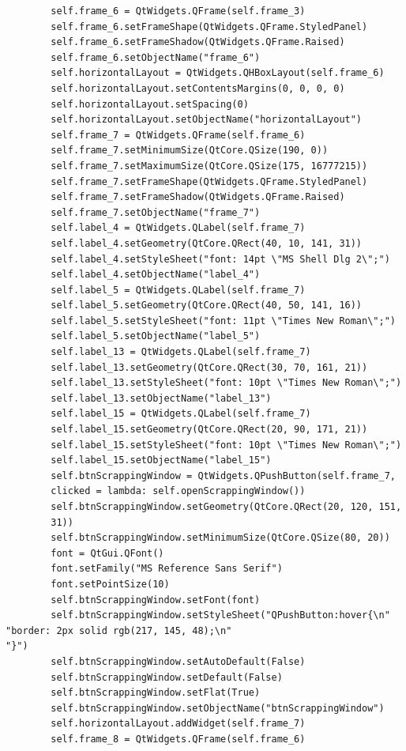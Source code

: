 \documentclass[12pt]{article}
\begin{document}
\begin{verbatim}
        self.frame_6 = QtWidgets.QFrame(self.frame_3)
        self.frame_6.setFrameShape(QtWidgets.QFrame.StyledPanel)
        self.frame_6.setFrameShadow(QtWidgets.QFrame.Raised)
        self.frame_6.setObjectName("frame_6")
        self.horizontalLayout = QtWidgets.QHBoxLayout(self.frame_6)
        self.horizontalLayout.setContentsMargins(0, 0, 0, 0)
        self.horizontalLayout.setSpacing(0)
        self.horizontalLayout.setObjectName("horizontalLayout")
        self.frame_7 = QtWidgets.QFrame(self.frame_6)
        self.frame_7.setMinimumSize(QtCore.QSize(190, 0))
        self.frame_7.setMaximumSize(QtCore.QSize(175, 16777215))
        self.frame_7.setFrameShape(QtWidgets.QFrame.StyledPanel)
        self.frame_7.setFrameShadow(QtWidgets.QFrame.Raised)
        self.frame_7.setObjectName("frame_7")
        self.label_4 = QtWidgets.QLabel(self.frame_7)
        self.label_4.setGeometry(QtCore.QRect(40, 10, 141, 31))
        self.label_4.setStyleSheet("font: 14pt \"MS Shell Dlg 2\";")
        self.label_4.setObjectName("label_4")
        self.label_5 = QtWidgets.QLabel(self.frame_7)
        self.label_5.setGeometry(QtCore.QRect(40, 50, 141, 16))
        self.label_5.setStyleSheet("font: 11pt \"Times New Roman\";")
        self.label_5.setObjectName("label_5")
        self.label_13 = QtWidgets.QLabel(self.frame_7)
        self.label_13.setGeometry(QtCore.QRect(30, 70, 161, 21))
        self.label_13.setStyleSheet("font: 10pt \"Times New Roman\";")
        self.label_13.setObjectName("label_13")
        self.label_15 = QtWidgets.QLabel(self.frame_7)
        self.label_15.setGeometry(QtCore.QRect(20, 90, 171, 21))
        self.label_15.setStyleSheet("font: 10pt \"Times New Roman\";")
        self.label_15.setObjectName("label_15")
        self.btnScrappingWindow = QtWidgets.QPushButton(self.frame_7,
        clicked = lambda: self.openScrappingWindow())
        self.btnScrappingWindow.setGeometry(QtCore.QRect(20, 120, 151,
        31))
        self.btnScrappingWindow.setMinimumSize(QtCore.QSize(80, 20))
        font = QtGui.QFont()
        font.setFamily("MS Reference Sans Serif")
        font.setPointSize(10)
        self.btnScrappingWindow.setFont(font)
        self.btnScrappingWindow.setStyleSheet("QPushButton:hover{\n"
"border: 2px solid rgb(217, 145, 48);\n"
"}")
        self.btnScrappingWindow.setAutoDefault(False)
        self.btnScrappingWindow.setDefault(False)
        self.btnScrappingWindow.setFlat(True)
        self.btnScrappingWindow.setObjectName("btnScrappingWindow")
        self.horizontalLayout.addWidget(self.frame_7)
        self.frame_8 = QtWidgets.QFrame(self.frame_6)

\end{verbatim}
\end{document}
